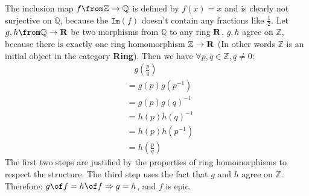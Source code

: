\begin{answer}
  The inclusion map $f \from \mathbb{Z} \to \mathbb{Q}$ is defined by
  $f(x) = x$ and is clearly not surjective on $\mathbb{Q}$, because
  the $\texttt{Im}(f)$ doesn't contain any fractions like $\frac{1}{2}$.
  Let $g,h \from \mathbb{Q} \to \bf{R}$ be two morphisms from
  $\mathbb{Q}$ to any ring $\bf{R}$.
  $g,h$ agree on $\mathbb{Z}$, because there is exactly one ring
  homomorphism $\mathbb{Z} \to \bf{R}$ (In other words $\mathbb{Z}$
  is an initial object in the category \textbf{Ring}).
  Then we have $\forall p,q \in \mathbb{Z}, q \neq 0$:
  \[
    \begin{aligned}
      & \ \ \ \ g(\frac{p}{q})\\
      &= g(p) g(p^{-1})\\
      &= g(p) g(q)^{-1}\\
      &= h(p) h(q)^{-1}\\
      &= h(p) h(p^{-1})\\
      &= h(\frac{p}{q})
    \end{aligned}
  \]
  The first two steps are justified by the
  properties of ring homomorphisms to respect the structure.
  The third step uses the fact that $g$ and $h$ agree on
  $\mathbb{Z}$.\\
  Therefore: $g \of f = h \of f \Rightarrow g = h$, and $f$ is epic.
\end{answer}


